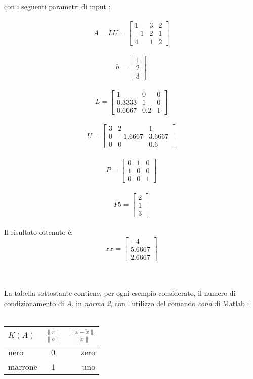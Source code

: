 \begin{description}
	con i seguenti parametri di input :\\\	  
	\[
	A = LU =\begin{bmatrix}
		1  & 3 & 2 \\ 
		-1 & 2 & 1 \\
		4  & 1 & 2 
	\end{bmatrix}
	\]\\
	\[
	b =\begin{bmatrix}
		1 \\
		2 \\
		3 
	\end{bmatrix}
	\]\\
	\[
	L =\begin{bmatrix}
		   1   &  0  & 0 \\ 
		0.3333 &  1  & 0 \\
		0.6667 & 0.2 & 1 
	\end{bmatrix}
	\]\\ 
	\[
	U =\begin{bmatrix}
		3 &    2    &    1   \\ 
		0 & -1.6667 & 3.6667 \\
		0 &    0    &   0.6 
	\end{bmatrix}
	\]\\ 
	\[
	P =\begin{bmatrix}
		0 & 1 & 0 \\ 
		1 & 0 & 0 \\
		0 & 0 & 1 
	\end{bmatrix}
	\]\\
	\[
	Pb =\begin{bmatrix}
		2 \\
		1 \\
		3                
	\end{bmatrix}
	\]\\
	Il risultato ottenuto è:\\
	\[
	xx =\begin{bmatrix}
		  -4   \\
		5.6667 \\
		2.6667 
	\end{bmatrix}
	\]\\\\
\end{description}
La tabella sottostante contiene, per ogni esempio considerato, il numero di condizionamento di \textit{A}, in \textit{norma 2}, con l'utilizzo del comando \textit{cond} di Matlab :\\\
\begin{center}
\begin{tabular}{ | l | c | r | }
	\hline
	$K(A)$    & $\frac{\|r\|}{\|b\|}$ & $\frac{\|x-\tilde{x}\|}{\|\tilde{x}\|}$ \\
	\hline
	nero    & 0           & zero                                          \\
	marrone & 1           & uno                                           \\
	\hline
\end{tabular}
\end{center}